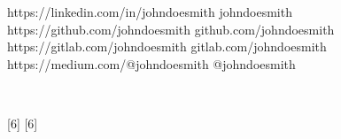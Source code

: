 {{\begin{icontable}[1.6]{1.7em}{0.4em}
            \cvmail{\mymail}
            
            \cvaddress{\myaddress}
		\end{icontable}
    
    		\begin{icontable}{1.5em}{1em}
    		    \social{\faLinkedin}
    				{https://linkedin.com/in/johndoesmith}
    				{johndoesmith}
    		    \social{\faGithubSquare}
    				{https://github.com/johndoesmith}
    				{github.com/johndoesmith}
    			\social{\faGitlab}
    				{https://gitlab.com/johndoesmith}
    				{gitlab.com/johndoesmith}
    			\social{\faMedium}
    			    {https://medium.com/@johndoesmith}
    			    {@johndoesmith}
    		\end{icontable}
    		
        	    {
        	        \hspace{0em}  ~ 
        	    } \par
        	    
    	
			
        
        	
        
        \null\vfill
        
        \sidesectioncentered{\raise \large \raisebox{0.5mm}{Legend}}
            \begin{sidebannerminipage}
                \centering
                \small
                \par
        	\end{sidebannerminipage}
        
        
    } %
}
